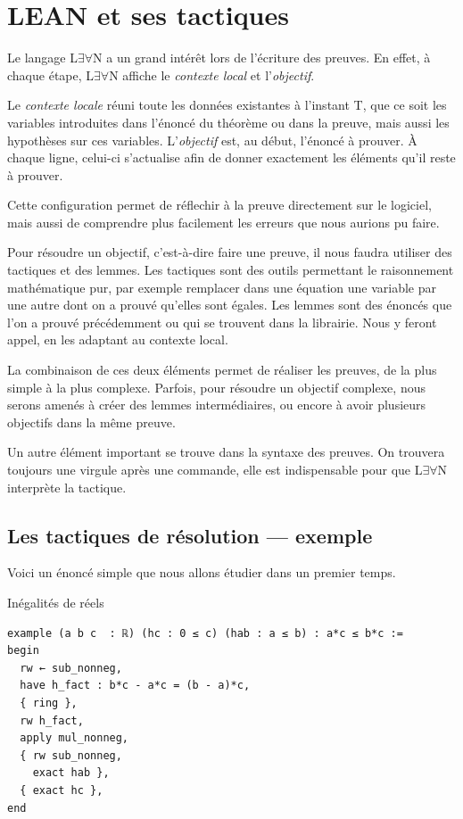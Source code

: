 \documentclass[a4paper, 11pt, twoside]{report}
\newcommand{\LEAN}{L$\exists\forall$N }
\begin{document}
\section{LEAN et ses tactiques}

Le langage \LEAN a un grand intérêt lors de l'écriture des preuves. En effet, à chaque étape, \LEAN affiche le \textit{contexte local} et l'\textit{objectif}. 

Le \textit{contexte locale} réuni toute les données existantes à l'instant T, que ce soit les variables introduites dans l'énoncé du théorème ou dans la preuve, mais aussi les hypothèses sur ces variables.
L'\textit{objectif} est, au début, l'énoncé à prouver. À chaque ligne, celui-ci s'actualise afin de donner exactement les éléments qu'il reste à prouver. 

Cette configuration permet de réflechir à la preuve directement sur le logiciel, mais aussi de comprendre plus facilement les erreurs que nous aurions pu faire.

Pour résoudre un objectif, c'est-à-dire faire une preuve, il nous faudra utiliser des tactiques et des lemmes. Les tactiques sont des outils permettant le raisonnement mathématique pur, par exemple remplacer dans une équation une variable par une autre dont on a prouvé qu'elles sont égales. Les lemmes sont des énoncés que l'on a prouvé précédemment ou qui se trouvent dans la librairie. Nous y feront appel, en les adaptant au contexte local.

La combinaison de ces deux éléments permet de réaliser les preuves, de la plus simple à la plus complexe. Parfois, pour résoudre un objectif complexe, nous serons amenés à créer des lemmes intermédiaires, ou encore à avoir plusieurs objectifs dans la même preuve.

Un autre élément important se trouve dans la syntaxe des preuves. On trouvera toujours une virgule après une commande, elle est indispensable pour que \LEAN interprète la tactique.

\subsection{Les tactiques de résolution --- exemple}

Voici un énoncé simple que nous allons étudier dans un premier temps.

\begin{code}{Inégalités de réels}
\begin{lstlisting}
example (a b c  : ℝ) (hc : 0 ≤ c) (hab : a ≤ b) : a*c ≤ b*c :=
begin
  rw ← sub_nonneg,
  have h_fact : b*c - a*c = (b - a)*c,
  { ring },
  rw h_fact,
  apply mul_nonneg,
  { rw sub_nonneg,
    exact hab },
  { exact hc },
end 
\end{lstlisting}
\end{code}
\end{document}
